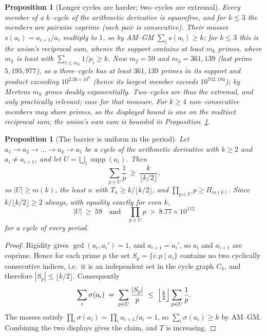 \documentclass[11pt]{article}
\newtheorem{proposition}[theorem]{Proposition}
\theoremstyle{definition}
\begin{document}
\begin{proposition}[Longer cycles are harder; two--cycles are extremal]\label{prop:kcycles}
Every member of a $k$--cycle of the arithmetic derivative is squarefree, and for $k\le3$ the members
are pairwise coprime (each pair is consecutive). Their masses $s(a_i)=a_{i+1}/a_i$ multiply to $1$,
so by AM--GM $\sum_i s(a_i)\ge k$; for $k\le3$ this is the union's reciprocal sum, whence the support
contains at least $m_k$ primes, where $m_k$ is least with $\sum_{i\le m_k}1/p_i\ge k$. Now $m_2=59$
and $m_3=361{,}139$ (last prime $5{,}195{,}977$), so a three--cycle has at least $361{,}139$ primes in
its support and product exceeding $10^{2.26\times10^{6}}$ (hence its largest member exceeds
$10^{752{,}194}$); by Mertens $m_k$ grows doubly exponentially. Two--cycles are thus the extremal,
and only practically relevant; case for that measure. For $k\ge4$ non--consecutive members may share
primes, so the displayed bound is one on the \emph{multiset} reciprocal sum; the union's own sum is
bounded in Proposition~\textup{\ref{prop:kuniform}}.
\end{proposition}

\begin{proposition}[The barrier is uniform in the period]\label{prop:kuniform}
Let $a_1\to a_2\to\dots\to a_k\to a_1$ be a cycle of the arithmetic derivative with $k\ge2$ and
$a_i\neq a_{i+1}$, and let $U=\bigcup_i\operatorname{supp}(a_i)$. Then
\[ \sum_{p\in U}\frac1p\ \ge\ \frac{k}{\lfloor k/2\rfloor}, \]
so $|U|\ge m(k)$, the least $n$ with $T_n\ge k/\lfloor k/2\rfloor$, and $\prod_{p\in U}p\ge\Pi_{m(k)}$.
Since $k/\lfloor k/2\rfloor\ge2$ always, with equality exactly for even $k$,
\[ |U|\ \ge\ 59\quad\text{and}\quad \prod_{p\in U}p\ >\ 8.77\times10^{112} \]
for a cycle of \emph{every} period.
\end{proposition}
\begin{proof}
Rigidity gives $\gcd(a_i,a_i')=1$, and $a_{i+1}=a_i'$, so $a_i$ and $a_{i+1}$ are coprime. Hence for
each prime $p$ the set $S_p=\{i:p\mid a_i\}$ contains no two cyclically consecutive indices, i.e.\ it
is an independent set in the cycle graph $C_k$, and therefore $|S_p|\le\lfloor k/2\rfloor$.
Consequently
\[ \sum_{i}\sigma(a_i)\;=\;\sum_{p\in U}\frac{|S_p|}{p}\;\le\;\Bigl\lfloor\tfrac k2\Bigr\rfloor
   \sum_{p\in U}\frac1p . \]
The masses satisfy $\prod_i\sigma(a_i)=\prod_i a_{i+1}/a_i=1$, so $\sum_i\sigma(a_i)\ge k$ by AM--GM.
Combining the two displays gives the claim, and $T$ is increasing.
\end{proof}
\end{document}
